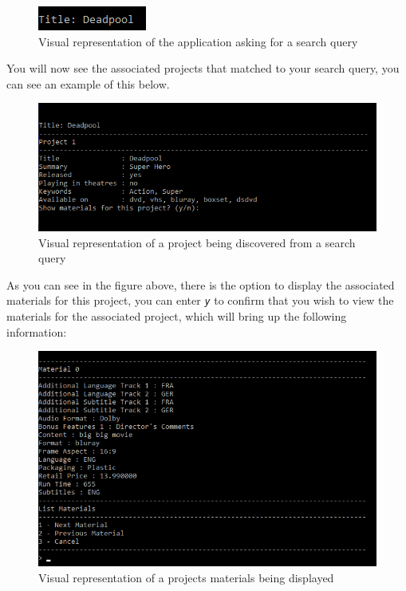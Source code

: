 \documentclass[
  english,
  a4paper,
,tablecaptionabove
]{scrartcl}
\begin{document}
\begin{figure}
\centering
\includegraphics{images/user-guide/view-mode/project-title-search.png}
\caption{Visual representation of the application asking for a search
query}
\end{figure}

You will now see the associated projects that matched to your search
query, you can see an example of this below.

\begin{figure}
\centering
\includegraphics{images/user-guide/view-mode/project-search-term.png}
\caption{Visual representation of a project being discovered from a
search query}
\end{figure}

As you can see in the figure above, there is the option to display the
associated materials for this project, you can enter \emph{\texttt{y}}
to confirm that you wish to view the materials for the associated
project, which will bring up the following information:

\begin{figure}
\centering
\includegraphics{images/user-guide/view-mode/project-search-list-material.png}
\caption{Visual representation of a projects materials being displayed}
\end{figure}
\end{document}
